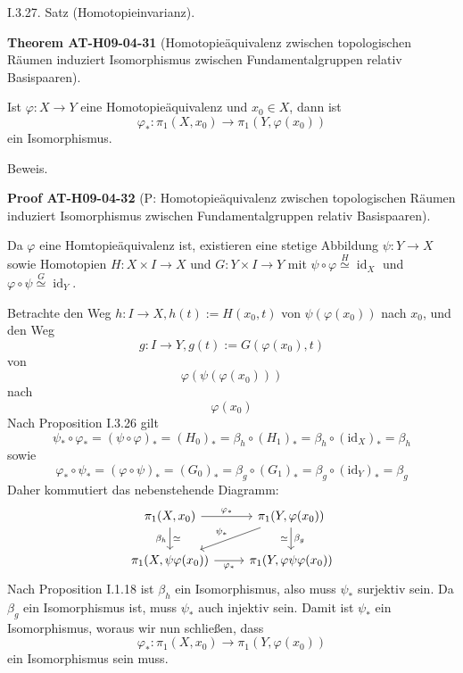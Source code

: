 \documentclass[10pt, letterpaper]{article}
\newcommand{\CustomHeading}[3]{%
  \par\medskip\noindent%
  \textbf{#1 #2} \textnormal{(#3)}.\enskip%
}
\newenvironment{THEO}[2]{\begin{unitbox}\CustomHeading{Theorem}{#1}{#2}}{\end{unitbox}}
\newenvironment{PROOF}[2]{\begin{unitbox}\CustomHeading{Proof}{#1}{#2}}{\end{unitbox}}
\begin{document}
I.3.27. Satz (Homotopieinvarianz). 


\begin{THEO}{AT-H09-04-31}{Homotopieäquivalenz zwischen topologischen Räumen induziert Isomorphismus zwischen Fundamentalgruppen relativ Basispaaren}
Ist $\varphi: X \rightarrow Y$ eine Homotopieäquivalenz und $x_{0} \in X$, dann ist 
$$\varphi_{*}: \pi_{1}\left(X, x_{0}\right) \rightarrow \pi_{1}\left(Y, \varphi\left(x_{0}\right)\right)$$ 
ein Isomorphismus.
\end{THEO}


Beweis. 


\begin{PROOF}{AT-H09-04-32}{P: Homotopieäquivalenz zwischen topologischen Räumen induziert Isomorphismus zwischen Fundamentalgruppen relativ Basispaaren}
Da $\varphi$ eine Homtopieäquivalenz ist, existieren eine stetige Abbildung $\psi: Y \rightarrow X$ sowie Homotopien 
$H: X \times I \rightarrow X$ und $G: Y \times I \rightarrow Y$ mit $\psi \circ \varphi \stackrel{H}{\simeq} \operatorname{id}_{X}$ und $\varphi \circ \psi \stackrel{G}{\simeq} \operatorname{id}_{Y}$. 

Betrachte den Weg $h: I \rightarrow X, h(t):=H\left(x_{0}, t\right)$ von $\psi\left(\varphi\left(x_{0}\right)\right)$ nach $x_{0}$, und den Weg 
$$g: I \rightarrow Y, g(t):=G\left(\varphi\left(x_{0}\right), t\right)$$ 
von 
$$\varphi\left(\psi\left(\varphi\left(x_{0}\right)\right)\right)$$ 
nach 
$$\varphi\left(x_{0}\right)$$ 
Nach Proposition I.3.26 gilt 
$$\psi_{*} \circ \varphi_{*}=(\psi \circ \varphi)_{*}=\left(H_{0}\right)_{*}=\beta_{h} \circ\left(H_{1}\right)_{*}= \beta_{h} \circ\left(\mathrm{id}_{X}\right)_{*}=\beta_{h}$$ 
sowie 
$$\varphi_{*} \circ \psi_{*}=(\varphi \circ \psi)_{*}=\left(G_{0}\right)_{*}=\beta_{g} \circ\left(G_{1}\right)_{*}=\beta_{g} \circ\left(\mathrm{id}_{Y}\right)_{*}=\beta_{g}$$ 
Daher kommutiert das nebenstehende Diagramm:
\[
\begin{tikzcd}
\pi_1(X, x_0) \arrow[r, "\varphi_*"] \arrow[d, "\beta_h"', "\simeq"] & \pi_1(Y, \varphi(x_0)) \arrow[d, "\beta_g", "\simeq"'] \arrow[dl, "\psi_*"'] \\
\pi_1(X, \psi\varphi(x_0)) \arrow[r, "\varphi_*"'] & \pi_1(Y, \varphi\psi\varphi(x_0))
\end{tikzcd}
\]
Nach Proposition I.1.18 ist $\beta_{h}$ ein Isomorphismus, also muss $\psi_{*}$ surjektiv sein. Da $\beta_{g}$ ein Isomorphismus ist, muss $\psi_{*}$ auch injektiv sein. Damit ist $\psi_{*}$ ein Isomorphismus, woraus wir nun schließen, dass 
$$\varphi_{*}: \pi_{1}\left(X, x_{0}\right) \rightarrow \pi_{1}\left(Y, \varphi\left(x_{0}\right)\right)$$ 
ein Isomorphismus sein muss.
\end{PROOF}
\end{document}
